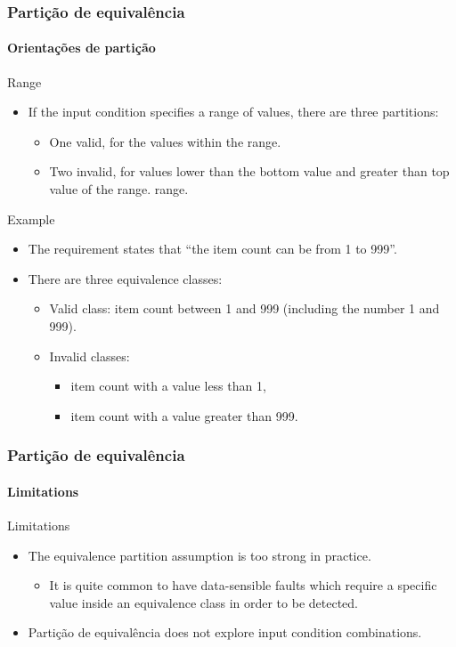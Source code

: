 \begin{frame}
\frametitle{Partição de equivalência}
\framesubtitle{Orientações de partição}

\begin{block:fact}{Range}
\begin{itemize}
	\item If the input condition specifies a range of values, there are three
	partitions:
	\begin{itemize}
		\item One valid, for the values within the range.

		\item Two invalid, for values lower than the bottom value and greater
		than top value of the range.
		range.
	\end{itemize}
\end{itemize}
\end{block:fact}


\begin{block}{Example}
\begin{itemize}
	\item The requirement states that ``the item count can be from 1 to 999''.

	\item There are three equivalence classes:
	\begin{itemize}
		\item Valid class: item count between 1 and 999 (including the number
		1 and 999).
		\item Invalid classes:
		\begin{itemize}
			\item item count with a value less than 1,
			\item item count with a value greater than 999.
		\end{itemize}
	\end{itemize}
\end{itemize}
\end{block}
\end{frame}



\begin{frame}
\frametitle{Partição de equivalência}
\framesubtitle{Limitations}

\begin{block:fact}{Limitations}
\begin{itemize}
	\item The equivalence partition assumption is too strong in practice.
	\begin{itemize}
		\item It is quite common to have data-sensible faults which require a
		specific value inside an equivalence class in order to be detected.
	\end{itemize}

	\item Partição de equivalência does not explore input condition combinations.
\end{itemize}
\end{block:fact}
\end{frame}
